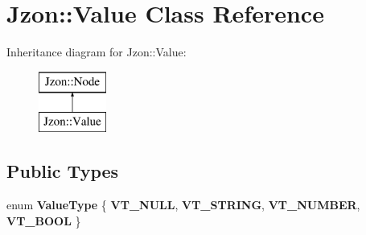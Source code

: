 \hypertarget{class_jzon_1_1_value}{\section{Jzon\-:\-:Value Class Reference}
\label{class_jzon_1_1_value}
}
Inheritance diagram for Jzon\-:\-:Value\-:\begin{figure}[H]
\begin{center}
\leavevmode
\includegraphics[height=2.000000cm]{class_jzon_1_1_value}
\end{center}
\end{figure}
\subsection*{Public Types}
\begin{DoxyCompactItemize}
\item 
enum {\bfseries Value\-Type} \{ {\bfseries V\-T\-\_\-\-N\-U\-L\-L}, 
{\bfseries V\-T\-\_\-\-S\-T\-R\-I\-N\-G}, 
{\bfseries V\-T\-\_\-\-N\-U\-M\-B\-E\-R}, 
{\bfseries V\-T\-\_\-\-B\-O\-O\-L}
 \}
\end{DoxyCompactItemize}
